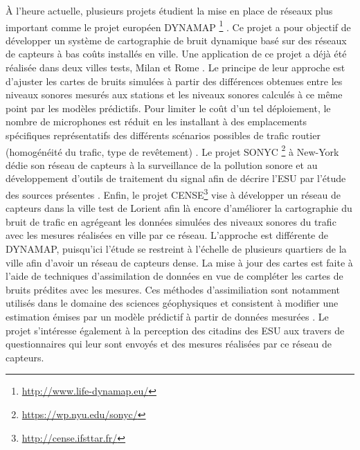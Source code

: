 \`A l'heure actuelle, plusieurs projets étudient la mise en place de réseaux plus important comme le projet européen DYNAMAP \footnote{\url{http://www.life-dynamap.eu/}} \cite{dynamap_2016}. Ce projet a pour objectif de développer un système de cartographie de bruit dynamique basé sur des réseaux de capteurs à bas coûts installés en ville. Une application de ce projet a déjà été réalisée dans deux villes tests, Milan et Rome \cite{bellucci_life_2017}.
Le principe de leur approche est d'ajuster les cartes de bruits simulées à partir des différences obtenues entre les niveaux sonores mesurés aux stations et les niveaux sonores calculés à ce même point par les modèles prédictifs. Pour limiter le coût d'un tel déploiement, le nombre de microphones est réduit en les installant à des emplacements spécifiques représentatifs des différents scénarios possibles de trafic routier (homogénéité du trafic, type de revêtement) \cite{zambon2017life}.
Le projet SONYC \footnote{\url{https://wp.nyu.edu/sonyc/}} à New-York dédie son réseau de capteurs à la surveillance de la pollution sonore et au développement d'outils de traitement du signal afin de décrire l'ESU par l'étude des sources présentes \cite{mydlarz2017noise}.
Enfin, le projet CENSE\footnote{\url{http://cense.ifsttar.fr/}} vise à développer un réseau de capteurs dans la ville test de Lorient afin là encore d'améliorer la cartographie du bruit de trafic en agrégeant les données simulées des niveaux sonores du trafic avec les mesures réalisées en ville par ce réseau. L'approche est différente de DYNAMAP, puisqu'ici l'étude se restreint à l'échelle de plusieurs quartiers de la ville afin d'avoir un réseau de capteurs dense. La mise à jour des cartes est faite à l'aide de techniques d'assimilation de données en vue de compléter les cartes de bruits prédites avec les mesures.
Ces méthodes d'assimiliation sont notamment utilisés dans le domaine des sciences géophysiques et consistent à modifier une estimation émises par un modèle prédictif à partir de données mesurées \cite{wu2008comparison}.
Le projet s'intéresse également à la perception des citadins des ESU aux travers de questionnaires qui leur sont envoyés et des mesures réalisées par ce réseau de capteurs.

